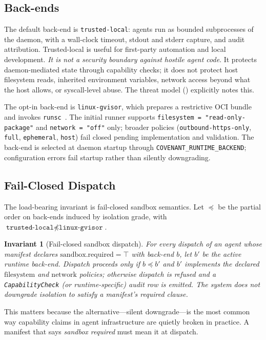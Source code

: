 \documentclass[11pt]{article}
\theoremstyle{plainsmall}
\newtheorem{invariant}{Invariant}
\begin{document}
\subsection{Back-ends}

The default back-end is \texttt{trusted-local}: agents run as bounded subprocesses of the daemon, with a wall-clock timeout, stdout and stderr capture, and audit attribution. Trusted-local is useful for first-party automation and local development. \emph{It is not a security boundary against hostile agent code}. It protects daemon-mediated state through capability checks; it does not protect host filesystem reads, inherited environment variables, network access beyond what the host allows, or syscall-level abuse. The threat model () explicitly notes this.

The opt-in back-end is \texttt{linux-gvisor}, which prepares a restrictive OCI bundle and invokes \texttt{runsc}~\cite{gvisor}. The initial runner supports \texttt{filesystem = "read-only-package"} and \texttt{network = "off"} only; broader policies (\texttt{outbound-https-only}, \texttt{full}, \texttt{ephemeral}, \texttt{host}) fail closed pending implementation and validation. The back-end is selected at daemon startup through \texttt{COVENANT\_RUNTIME\_BACKEND}; configuration errors fail startup rather than silently downgrading.

\subsection{Fail-Closed Dispatch}

The load-bearing invariant is fail-closed sandbox semantics. Let $\preceq$ be the partial order on back-ends induced by isolation grade, with $\texttt{trusted-local} \not\preceq \texttt{linux-gvisor}$.

\begin{invariant}[Fail-closed sandbox dispatch]
\label{inv:failclosed}
For every dispatch of an agent whose manifest declares $\mathrm{sandbox.required} = \top$ with back-end $b$, let $b'$ be the active runtime back-end. Dispatch proceeds only if $b \preceq b'$ \emph{and} $b'$ implements the declared $\mathrm{filesystem}$ and $\mathrm{network}$ policies; otherwise dispatch is refused and a \texttt{CapabilityCheck} (or runtime-specific) audit row is emitted. The system does not downgrade isolation to satisfy a manifest's required clause.
\end{invariant}

This matters because the alternative---silent downgrade---is the most common way capability claims in agent infrastructure are quietly broken in practice. A manifest that says \emph{sandbox required} must mean it at dispatch.
\end{document}
